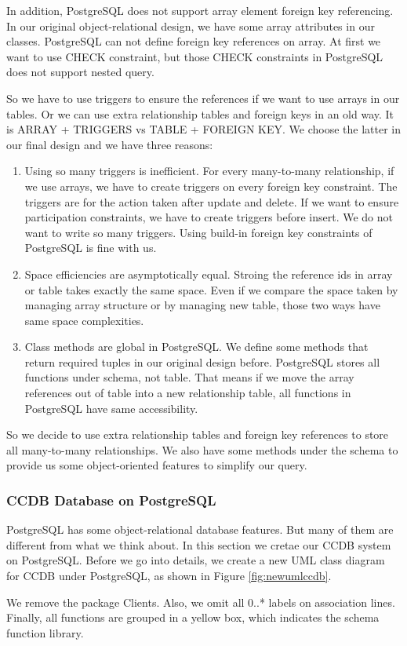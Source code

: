 \documentclass[11pt]{article}
\begin{document}
\par
In addition, PostgreSQL does not support array element foreign key referencing. In our original object-relational design, we have some array attributes in our classes. PostgreSQL can not define foreign key references on array. At first we want to use CHECK constraint, but those CHECK constraints in PostgreSQL does not support nested query.
\par
So we have to use triggers to ensure the references if we want to use arrays in our tables. Or we can use extra relationship tables and foreign keys in an old way. It is ARRAY + TRIGGERS vs TABLE + FOREIGN KEY. We choose the latter in our final design and we have three reasons:
\par
\begin{enumerate}
\item Using so many triggers is inefficient. For every many-to-many relationship, if we use arrays, we have to create triggers on every foreign key constraint. The triggers are for the action taken after update and delete. If we want to ensure participation constraints, we have to create triggers before insert. We do not want to write so many triggers. Using build-in foreign key constraints of PostgreSQL is fine with us.
\item Space efficiencies are asymptotically equal. Stroing the reference ids in array or table takes exactly the same space. Even if we compare the space taken by managing array structure or by managing new table, those two ways have same space complexities.
\item Class methods are global in PostgreSQL. We define some methods that return required tuples in our original design before. PostgreSQL stores all functions under schema, not table. That means if we move the array references out of table into a new relationship table, all functions in PostgreSQL have same accessibility.
\end{enumerate}
\par
So we decide to use extra relationship tables and foreign key references to store all many-to-many relationships. We also have some methods under the schema to provide us some object-oriented features to simplify our query.

\subsubsection{CCDB Database on PostgreSQL}
\par
PostgreSQL has some object-relational database features. But many of them are different from what we think about. In this section we cretae our CCDB system on PostgreSQL. Before we go into details, we create a new UML class diagram for CCDB under PostgreSQL, as shown in Figure \ref{fig:newumlccdb}.
\par
We remove the package Clients. Also, we omit all 0..* labels on association lines. Finally, all functions are grouped in a yellow box, which indicates the schema function library.
\end{document}
